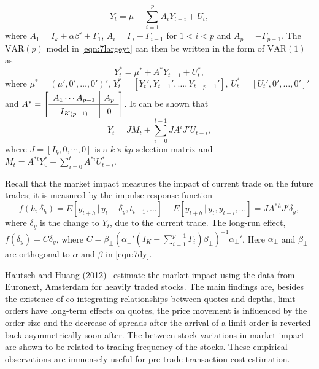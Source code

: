 	\begin{equation} \label{eqn:7largeyt}
	Y_t = \mu + \sum_{i=1}^p A_i Y_{t-i} + U_t,
	\end{equation}
where $A_1= I_k + \alpha\beta' + \Gamma_1$, $A_i= \Gamma_i - \Gamma_{i-1}$ for $1 < i < p$ and $A_p= -\Gamma_{p-1}$. The $\text{VAR}(p)$ model in \eqref{eqn:7largeyt} can then be written in the form of $\text{VAR}(1)$ as 
	\begin{equation}\label{eqn:starlargeyt}
	Y_t^*= \mu^* + A^* Y_{t-1} + U_t^*,
	\end{equation}
where $\mu^*=(\mu',0',\ldots,0')'$, $Y_t^*=[Y_t',Y_{t-1}',\ldots,Y_{t-p+1}']$, $U_t^*=[U_t',0',\ldots,0']'$ and $A^*=\renewcommand\arraystretch{1.3} \mleft[ \begin{array}{c|c} A_1\cdots A_{p-1} & A_p \\ \hline I_{K(p-1)} & 0 \end{array} \mright]$. It can be shown that 
	\begin{equation}\label{eqn:7anotherlargeyt}
	Y_t= JM_t + \sum_{i=0}^{t-1} JA^i J' U_{t-i},
	\end{equation}
where $J=[I_k,0,\cdots,0]$ is a $k\times kp$ selection matrix and $M_t= A^{*t} Y_0^* + \sum_{i=0}^t A^{*i}U_{t-i}^*$.


Recall that the market impact measures the impact of current trade on the future trades; it is measured by the impulse response function
	\begin{equation} \label{eqn:impulserep}
	f(h,\delta_h) = E[y_{t+h} \,|\, y_t+\delta_y,t_{t-1}, \ldots] - E[y_{t+h} \,|\, y_t,y_{t-i}, \ldots] = JA^{*h} J' \delta_y,
	\end{equation}
where $\delta_y$ is the change to $Y_t$, due to the current trade. The long-run effect, $f(\delta_y)= C \delta_y$, where $C= \beta_\perp(\alpha_\perp' (I_K - \sum_{i=1}^{p-1} \Gamma_i ) \beta_\perp )^{-1} \alpha_\perp'$. Here $\alpha_\perp$ and $\beta_\perp$ are orthogonal to $\alpha$ and $\beta$ in \eqref{eqn:7dy}.


Hautsch and Huang (2012)~\cite{hauthuang} estimate the market impact using the data from Euronext, Amsterdam for heavily traded stocks. The main findings are, besides the existence of co-integrating relationships between quotes and depths, limit orders have long-term effects on quotes, the price movement is influenced by the order size and the decrease of spreads after the arrival of a limit order is reverted back asymmetrically soon after. The between-stock variations in market impact are shown to be related to trading frequency of the stocks. These empirical observations are immensely useful for pre-trade transaction cost estimation.


